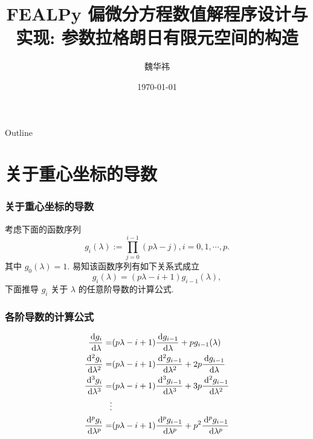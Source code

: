\documentclass{beamer}
\title{FEALPy 偏微分方程数值解程序设计与实现: 
    {\bf 参数拉格朗日有限元空间的构造}}
\author{魏华祎}
\institute[XTU]{
weihuayi@xtu.edu.cn\\
\vspace{5pt}
湘潭大学$\bullet$数学与计算科学学院\\
}
\date[XTU]
{
    \today
}
\numberwithin{subsection}{section}
\begin{document}
\begin{frame}
  \titlepage
\end{frame}

\begin{frame}{Outline}
  \tableofcontents
\end{frame}

\section{关于重心坐标的导数}

\begin{frame}
    \frametitle{关于重心坐标的导数}
    考虑下面的函数序列
    $$
        g_i(\lambda) := \prod_{j=0}^{i-1}(p\lambda - j), i=0, 1, \cdots, p.
    $$
    其中 $g_0(\lambda) = 1$. 易知该函数序列有如下关系式成立
    $$
        g_i(\lambda) = (p\lambda - i + 1)g_{i-1}(\lambda),
    $$
    下面推导 $g_i$ 关于 $\lambda$ 的任意阶导数的计算公式.
\end{frame}

\begin{frame}
    \frametitle{各阶导数的计算公式}
    \begin{align*}
        \frac{\,\mathrm d g_i}{\,\mathrm d \lambda} =& (p\lambda - i + 1)\frac{\,\mathrm d g_{i-1}}{\,\mathrm d \lambda} + pg_{i-1}(\lambda) \\
        \frac{\,\mathrm d^2 g_i}{\,\mathrm d \lambda^2} =&
        (p\lambda - i + 1)\frac{\,\mathrm d^2 g_{i-1}}{\,\mathrm d \lambda^2} +
        2p\frac{\,\mathrm d g_{i-1}}{\,\mathrm d \lambda}\\ 
        \frac{\,\mathrm d^3 g_i}{\,\mathrm d \lambda^3} =&
        (p\lambda - i + 1)\frac{\,\mathrm d^3 g_{i-1}}{\,\mathrm d \lambda^3} +
        3p\frac{\,\mathrm d^2 g_{i-1}}{\,\mathrm d \lambda^2}\\ 
        \vdots & \\
        \frac{\,\mathrm d^p g_i}{\,\mathrm d \lambda^p} =&
        (p\lambda - i + 1)\frac{\,\mathrm d^p g_{i-1}}{\,\mathrm d \lambda^p} +
        p^2\frac{\,\mathrm d^p g_{i-1}}{\,\mathrm d \lambda^p}\\ 
    \end{align*}
\end{frame}
\end{document}
